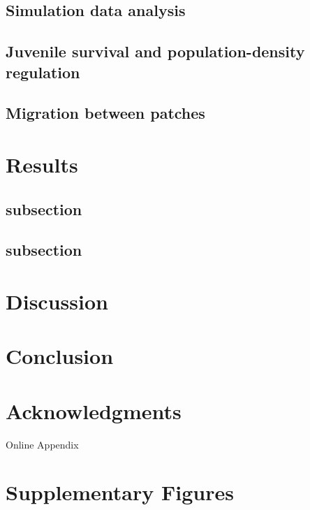 \documentclass[11pt]{article}
\begin{document}
\subsection*{Simulation data analysis}

\subsection*{Juvenile survival and population-density regulation}

\subsection*{Migration between patches}

\section*{Results}


\subsection*{subsection}


\subsection*{subsection}

\section*{Discussion}

\section*{Conclusion}

\section*{Acknowledgments}

\newpage{}

{\LARGE Online Appendix}

\appendix

\section{Supplementary Figures}

\end{document}
